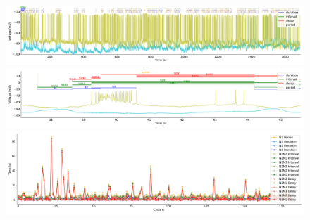 \begin{figure}[htbp]
	\centering
	\begin{minipage}[b]{\textwidth}
		\centering
		\includegraphics[width=\textwidth,height=0.1\textheight]{./invariants/data/SUSSEX/prep1/images/spontaneous_signal_intervals_zoom.pdf}
		\includegraphics[width=\textwidth]{./invariants/data/SUSSEX/prep1/images/spontaneous_signal_intervals_cycle.pdf}
		\includegraphics[width=\textwidth]{./invariants/data/SUSSEX/prep1/images/spontaneous_time_cycle.pdf}
	\end{minipage}
	\centering
	\begin{minipage}[b]{0.45\textwidth}
		\centering

\end{minipage}
\end{figure}
